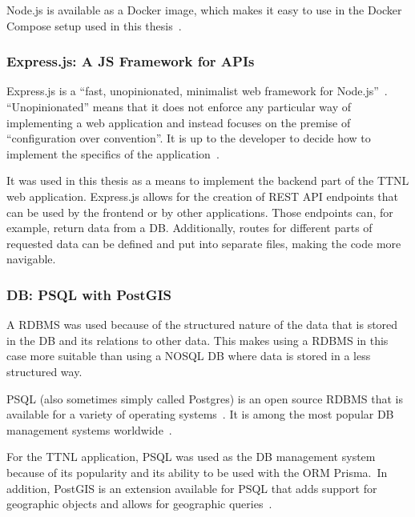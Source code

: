 Node.js is available as a Docker image, which makes it easy to use in the Docker Compose setup used in this thesis~\cite{docker_inc_node_2023}.

\subsubsection{Express.js: A \acl{JS} Framework for \aclp{API}}

Express.js is a ``fast, unopinionated, minimalist web framework for Node.js''~\cite{openjs_foundation_express_nodate}.
``Unopinionated'' means that it does not enforce any particular way of implementing a web application and instead focuses on the premise of ``configuration over convention''.
It is up to the developer to decide how to implement the specifics of the application~\cite{mardan_pro_2014}.

It was used in this thesis as a means to implement the backend part of the \ac{TTNL} web application.
Express.js allows for the creation of \ac{REST} \ac{API} endpoints that can be used by the frontend or by other applications.
Those endpoints can, for example, return data from a \ac{DB}.
Additionally, routes for different parts of requested data can be defined and put into separate files, making the code more navigable.

\subsubsection{\acl{DB}: \acl{PSQL} with PostGIS}

A \ac{RDBMS} was used because of the structured nature of the data that is stored in the \ac{DB} and its relations to other data.
This makes using a \ac{RDBMS} in this case more suitable than using a NOSQL \ac{DB} where data is stored in a less structured way.

\acl{PSQL} (also sometimes simply called Postgres) is an open source \ac{RDBMS} that is available for a variety of operating systems~\cite{postgresql_global_development_group_postgresql_2023}.
It is among the most popular \ac{DB} management systems worldwide~\cite{db-engines_most_2023}.

For the \ac{TTNL} application, \ac{PSQL} was used as the \ac{DB} management system because of its popularity and its ability to be used with the \ac{ORM} Prisma.\
In addition, PostGIS is an extension available for \ac{PSQL} that adds support for geographic objects and allows for geographic queries~\cite{postgis_psc__osgeo_postgis_2023}.

